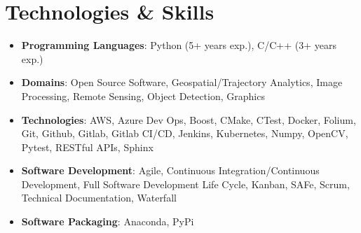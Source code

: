 \documentclass[letterpaper,10pt]{article}
\makeatletter
\newcommand{\resumeAwardItem}[3]{
  \item
    \begin{tabular*}{0.97\textwidth}{l@{\extracolsep{\fill}}r}
      \textbf{#1} \textit{\small #2} & \textit{\small #3} \\
    \end{tabular*}
}
\newcommand{\resumeSubHeadingListStart}{\begin{itemize}[leftmargin=*]}
\newcommand{\resumeSubHeadingListEnd}{\end{itemize}}
\makeatother
\begin{document}
\section{Technologies \& Skills}
 \resumeSubHeadingListStart
   \item{
     \textbf{Programming Languages}{: Python (5+ years exp.), C/C++ (3+ years exp.) }
   }
   \item{
    \textbf{Domains}{: Open Source Software, Geospatial/Trajectory Analytics, Image Processing, Remote Sensing, Object Detection, Graphics}
   }
   \item{
    \textbf{Technologies}{: AWS, Azure Dev Ops, Boost, CMake, CTest, Docker, Folium, Git, Github, Gitlab, Gitlab CI/CD, Jenkins, Kubernetes, Numpy, OpenCV, Pytest, RESTful APIs, Sphinx}
   }
   \item{
    \textbf{Software Development}{: Agile, Continuous Integration/Continuous Development, Full Software Development Life Cycle, Kanban, SAFe, Scrum, Technical Documentation, Waterfall}
   }
   \item{
    \textbf{Software Packaging}{: Anaconda, PyPi}
   }
 \resumeSubHeadingListEnd



\end{document}
